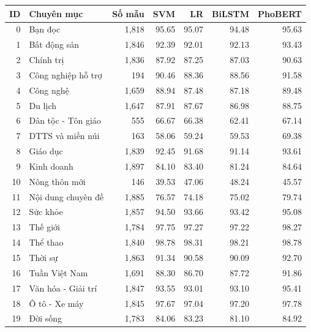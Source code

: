 \begin{tabular}{rp{45mm}rrrrr}\toprule
ID & Chuyên mục & Số mẫu & SVM & LR & BiLSTM & PhoBERT\\\midrule
0 & Bạn đọc & 1,818 & 95.65 & 95.07 & 94.48 & 95.63\\
1 & Bất động sản & 1,846 & 92.39 & 92.01 & 92.13 & 93.43\\
2 & Chính trị & 1,836 & 87.92 & 87.25 & 87.03 & 90.63\\
3 & Công nghiệp hỗ trợ & 194 & 90.46 & 88.36 & 88.56 & 91.58\\
4 & Công nghệ & 1,659 & 88.94 & 87.48 & 87.18 & 89.48\\
5 & Du lịch & 1,647 & 87.91 & 87.67 & 86.98 & 88.75\\
6 & Dân tộc - Tôn giáo & 555 & 66.67 & 66.38 & 62.41 & 67.14\\
7 & DTTS và miền núi & 163 & 58.06 & 59.24 & 59.53 & 69.38\\
8 & Giáo dục & 1,839 & 92.45 & 91.68 & 91.14 & 93.61\\
9 & Kinh doanh & 1,897 & 84.10 & 83.40 & 81.24 & 84.64\\
10 & Nông thôn mới & 146 & 39.53 & 47.06 & 48.24 & 45.57\\
11 & Nội dung chuyên đề & 1,885 & 76.57 & 74.18 & 75.02 & 79.74\\
12 & Sức khỏe & 1,857 & 94.50 & 93.66 & 93.42 & 95.08\\
13 & Thế giới & 1,784 & 97.75 & 97.27 & 97.22 & 98.27\\
14 & Thể thao & 1,840 & 98.78 & 98.31 & 98.21 & 98.78\\
15 & Thời sự & 1,863 & 91.34 & 90.58 & 90.09 & 92.70\\
16 & Tuần Việt Nam & 1,691 & 88.30 & 86.70 & 87.72 & 91.86\\
17 & Văn hóa - Giải trí & 1,847 & 93.55 & 93.01 & 93.10 & 95.41\\
18 & Ô tô - Xe máy & 1,845 & 97.67 & 97.04 & 97.20 & 97.78\\
19 & Đời sống & 1,783 & 84.06 & 83.23 & 81.10 & 84.92\\
\bottomrule\end{tabular}
